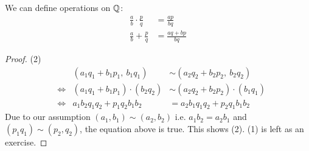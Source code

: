 \begin{rt}
	We can define operations on $\mathbb Q$:
	\begin{align*}
	\frac a b \cdot \frac p q & = \frac{ap}{bq} \\
	\frac a b + \frac p q & = \frac{aq + bp}{bq}
	\end{align*}
\end{rt}

\begin{proof}
	(2) 
	\begin{align*}
	& & (a_1 q_1 + b_1 p_1, ~b_1 q_1) & \sim (a_2 q_2 + b_2 p_2, ~ b_2 q_2) \\
	& \Leftrightarrow & (a_1 q_1 + b_1 p_1) \cdot (b_2 q_2) & \sim (a_2 q_2 + b_2 p_2) \cdot ( b_1 q_1) \\
	& \Leftrightarrow & a_1 b_2 q_1 q_2 + p_1 q_2 b_1 b_2 & = a_2 b_1 q_1 q_2 + p_2 q_1 b_1 b_2
	\end{align*}
	Due to our assumption $(a_1, b_1) \sim (a_2, b_2)$ i.e. $a_1 b_2 = a_2 b_1$ and $(p_1 q_1) \sim (p_2, q_2)$, the equation above is true. This shows (2). (1) is left as an exercise.
\end{proof}

